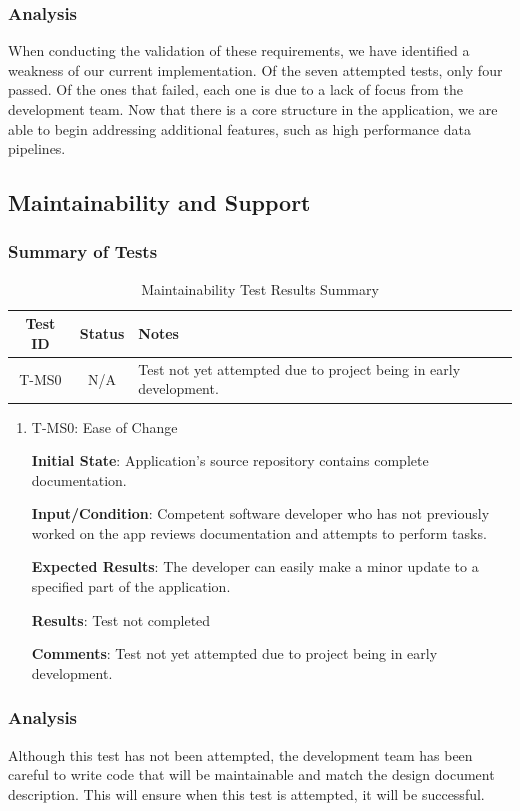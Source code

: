 \documentclass[12pt, titlepage]{article}
\begin{document}
\subsubsection{Analysis}
When conducting the validation of these requirements, we have identified a weakness of our current implementation. Of the seven attempted tests, only four passed. Of the ones that failed,
each one is due to a lack of focus from the development team. Now that there is a core structure in the application, we are able to begin addressing additional features, such as high performance data pipelines. 

\subsection{Maintainability and Support}
\subsubsection{Summary of Tests}
\begin{table}[H]
    \centering
    \begin{tabular}{|c|c|l|}
        \hline
        \textbf{Test ID} & \textbf{Status} & \textbf{Notes}\\
        \hline
        T-MS0 & N/A & Test not yet attempted due to project being in early development.\\
        \hline
    \end{tabular}
    \caption{Maintainability Test Results Summary}
\end{table}
\begin{enumerate}

\item{T-MS0: Ease of Change\\}

					
\textbf{Initial State}: Application's source repository contains complete documentation.
					
\textbf{Input/Condition}: Competent software developer who has not previously worked on the app reviews documentation and attempts to perform tasks.
					
\textbf{Expected Results}: The developer can easily make a minor update to a specified part of the application.
	
\textbf{Results}: Test not completed

\textbf{Comments}: Test not yet attempted due to project being in early development.
\end{enumerate}
\subsubsection{Analysis}
Although this test has not been attempted, the development team has been careful to write code that will be maintainable and match the design document description. This will ensure when this test is attempted, it will be successful.
\end{document}
